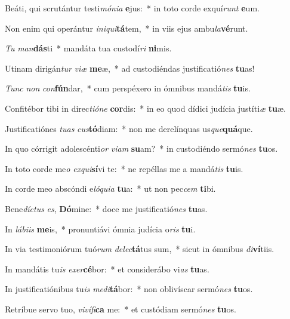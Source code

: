 \item Beáti, qui scrutántur testi\textit{mó}\textit{ni}\textit{a} \textbf{e}jus:~* in toto corde exquí\textit{runt} \textbf{e}um.
\item Non enim qui operántur \textit{in}\textit{i}\textit{qui}\textbf{tá}tem,~* in viis ejus ambu\textit{la}\textbf{vé}runt.
\item \textit{Tu} \textit{man}\textbf{dás}ti~* mandáta tua custodí\textit{ri} \textbf{ni}mis.
\item Utinam dirigán\textit{tur} \textit{vi}\textit{æ} \textbf{me}æ,~* ad custodiéndas justificatió\textit{nes} \textbf{tu}as!
\item \textit{Tunc} \textit{non} \textit{con}\textbf{fún}dar,~* cum perspéxero in ómnibus mandá\textit{tis} \textbf{tu}is.
\item Confitébor tibi in direc\textit{ti}\textit{ó}\textit{ne} \textbf{cor}dis:~* in eo quod dídici judícia justíti\textit{æ} \textbf{tu}æ.
\item Justificatiónes \textit{tu}\textit{as} \textit{cus}\textbf{tó}diam:~* non me derelínquas us\textit{que}\textbf{quá}que.
\item In quo córrigit adolescénti\textit{or} \textit{vi}\textit{am} \textbf{su}am?~* in custodiéndo sermó\textit{nes} \textbf{tu}os.
\item In toto corde me\textit{o} \textit{ex}\textit{qui}\textbf{sí}vi te:~* ne repéllas me a mandá\textit{tis} \textbf{tu}is.
\item In corde meo abscóndi e\textit{ló}\textit{qui}\textit{a} \textbf{tu}a:~* ut non pec\textit{cem} \textbf{ti}bi.
\item Bene\textit{díc}\textit{tus} \textit{es}, \textbf{Dó}mine:~* doce me justificatió\textit{nes} \textbf{tu}as.
\item In \textit{lá}\textit{bi}\textit{is} \textbf{me}is,~* pronuntiávi ómnia judícia o\textit{ris} \textbf{tu}i.
\item In via testimoniórum tuó\textit{rum} \textit{de}\textit{lec}\textbf{tá}tus sum,~* sicut in ómnibus \textit{di}\textbf{ví}tiis.
\item In mandátis tu\textit{is} \textit{ex}\textit{er}\textbf{cé}bor:~* et considerábo vi\textit{as} \textbf{tu}as.
\item In justificatiónibus tu\textit{is} \textit{me}\textit{di}\textbf{tá}bor:~* non oblivíscar sermó\textit{nes} \textbf{tu}os.
\item Retríbue servo tuo, \textit{vi}\textit{ví}\textit{fi}\textbf{ca} me:~* et custódiam sermó\textit{nes} \textbf{tu}os.
